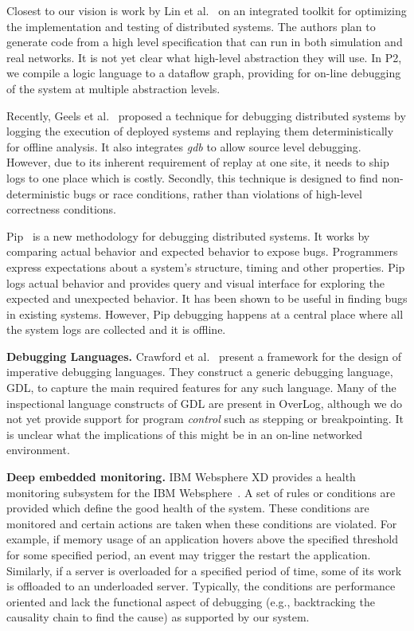 \documentclass{sig-alt-full}
\def\Sys{P2\xspace}
\begin{document}
Closest to our vision is work by Lin et al.~\cite{wids-hotos05} on an
integrated toolkit for optimizing the implementation and testing of
distributed systems. The authors plan to generate
code from a high level specification that can run in both
simulation and real networks.  It is not yet clear what
high-level abstraction they will use.  In \Sys, we
compile a logic language to a dataflow graph,
providing for on-line debugging of the system at
multiple abstraction levels.

Recently, Geels et al.~\cite{Geels2006} proposed a technique for 
debugging distributed systems by logging the execution of 
deployed systems and replaying them deterministically for offline analysis. It 
also integrates \textit{gdb} to allow source level debugging. However, due
to its inherent requirement of replay at one site, it needs to ship logs to 
one place which is costly. Secondly, this technique is designed to find
non-deterministic bugs or race conditions, rather than violations of high-level 
correctness conditions.


Pip~\cite{pip_nsdi_2006} is a new methodology 
for debugging distributed systems. It works by comparing actual behavior and 
expected behavior to expose bugs. Programmers express expectations about a system's
structure, timing and other properties. Pip logs actual behavior and provides query and
visual interface for exploring the expected and unexpected behavior. It has been
shown to be useful in finding bugs in existing systems. However, Pip debugging
happens at a central place where all the system logs are collected and it is offline.

{\bf Debugging Languages.} Crawford et al.~\cite{Crawford1995} present a
framework for the design of imperative debugging
languages.  They construct a generic debugging
language, GDL, to capture the main required features for any
such language.  Many of the inspectional language
constructs of GDL are present in OverLog, although we do not yet
provide support for program \emph{control} such as stepping or
breakpointing.  It is unclear what the implications
of this might be
in an on-line networked environment. 

{\bf Deep embedded monitoring.} IBM Websphere XD provides a health monitoring 
subsystem for the IBM Websphere~\cite{IBM_web:website}. A set of rules or 
conditions are provided
which define the good health of the system. 
These conditions are monitored and
certain actions are taken when these conditions are
violated. For example, if memory usage of
an application hovers above the specified threshold for some specified 
period, an event may trigger the restart the
application.  Similarly, if a server is overloaded for a specified period of time, some of its work is offloaded to an underloaded server.
Typically, the conditions are performance oriented and lack the functional 
aspect of debugging (e.g., backtracking the causality chain to find the cause) as supported by our system.
\end{document}
